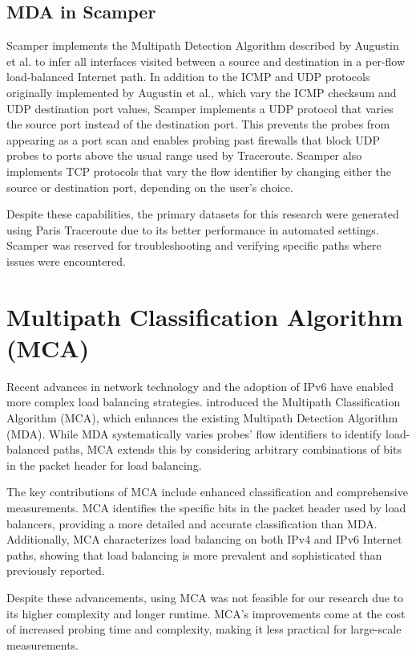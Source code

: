 \documentclass[12pt]{cwru_thesis}
\begin{document}
\subsection{MDA in Scamper}

Scamper implements the Multipath Detection Algorithm described by Augustin et al. to infer all interfaces visited between a source and destination in a per-flow load-balanced Internet path. In addition to the ICMP and UDP protocols originally implemented by Augustin et al., which vary the ICMP checksum and UDP destination port values, Scamper implements a UDP protocol that varies the source port instead of the destination port. This prevents the probes from appearing as a port scan and enables probing past firewalls that block UDP probes to ports above the usual range used by Traceroute. Scamper also implements TCP protocols that vary the flow identifier by changing either the source or destination port, depending on the user’s choice.

Despite these capabilities, the primary datasets for this research were generated using Paris Traceroute due to its better performance in automated settings. Scamper was reserved for troubleshooting and verifying specific paths where issues were encountered.

\section{Multipath Classification Algorithm (MCA)}

Recent advances in network technology and the adoption of IPv6 have enabled more complex load balancing strategies.  \cite{9155387} introduced the Multipath Classification Algorithm (MCA), which enhances the existing Multipath Detection Algorithm (MDA). While MDA systematically varies probes' flow identifiers to identify load-balanced paths, MCA extends this by considering arbitrary combinations of bits in the packet header for load balancing.

The key contributions of MCA include enhanced classification and comprehensive measurements. MCA identifies the specific bits in the packet header used by load balancers, providing a more detailed and accurate classification than MDA. Additionally, MCA characterizes load balancing on both IPv4 and IPv6 Internet paths, showing that load balancing is more prevalent and sophisticated than previously reported.


Despite these advancements, using MCA was not feasible for our research due to its higher complexity and longer runtime. MCA's improvements come at the cost of increased probing time and complexity, making it less practical for large-scale measurements.\\
\end{document}
